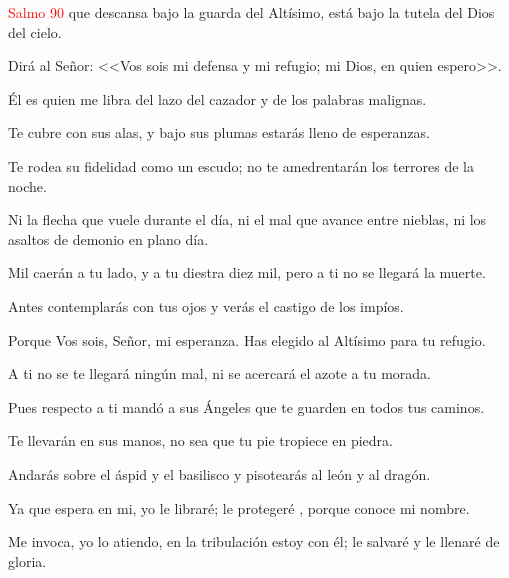 \documentclass[9pt]{article}
\begin{document}
\begin{multicols}{2}
      \hfill\textcolor{red}{Salmo 90}
      que descansa bajo la guarda del Altísimo, está bajo la tutela del Dios del cielo.

      Dirá al Señor: <<Vos sois mi defensa y mi refugio; mi Dios, en quien espero>>.

      Él es quien me libra del lazo del cazador y de los palabras malignas.

      Te cubre con sus alas, y bajo sus plumas estarás lleno de esperanzas.

      Te rodea su fidelidad como un escudo; no te amedrentarán los terrores de la noche.

      Ni la flecha que vuele durante el día, ni el mal que avance entre nieblas, ni los asaltos de demonio en plano día.

      Mil caerán a tu lado, y a tu diestra diez mil, pero a ti no se llegará la muerte.

      Antes contemplarás con tus ojos y verás el castigo de los impíos.

      Porque Vos sois, Señor, mi esperanza. Has elegido al Altísimo para tu refugio.

      A ti no se te llegará ningún mal, ni se acercará el azote a tu morada.

      Pues respecto a ti mandó a sus Ángeles que te guarden en todos tus caminos.

      Te llevarán en sus manos, no sea que tu pie tropiece en piedra.

      Andarás sobre el áspid y el basilisco y pisotearás al león y al dragón.

      Ya que espera en mi, yo le libraré; le protegeré , porque conoce mi nombre.

      Me invoca, yo lo atiendo, en la tribulación estoy con él; le salvaré y le llenaré de gloria.


\end{multicols}
\end{document}
